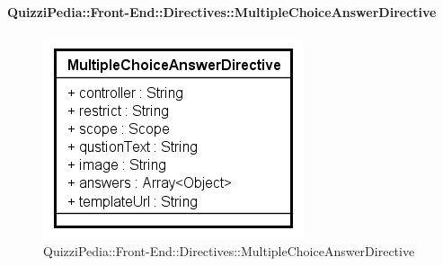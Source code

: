 	\paragraph[QuizziPedia::Front-End::Directives\\::MultipleChoiceAnswerDirective]{QuizziPedia::Front-End::Directives::MultipleChoiceAnswerDirective}
		
		\label{QuizziPedia::Front-End::Directives::MultipleChoiceAnswerDirective}
		
		\begin{figure}[ht]
			\centering
			\includegraphics[scale=0.80,keepaspectratio]{UML/Classi/Front-End/QuizziPedia_Front-end_Templates_MultipleChoiceAnswerTemplate.png}
			\caption{QuizziPedia::Front-End::Directives::MultipleChoiceAnswerDirective}
		\end{figure} \FloatBarrier
		
